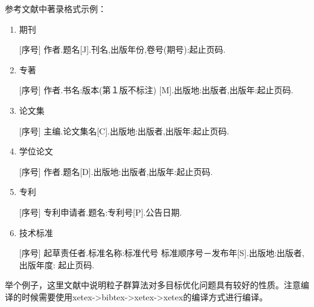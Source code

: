 \documentclass{suesreport}
\begin{document}
    
    参考文献中著录格式示例：
    \begin{enumerate}[label=（\arabic*） ]
        \item 期刊
        
        [序号] 作者.题名[J].刊名,出版年份,卷号(期号):起止页码.
        \item 专著
        
        [序号] 作者.书名:版本(第１版不标注) [M].出版地:出版者,出版年:起止页码.

        \item 论文集
        
        [序号] 主编.论文集名[C].出版地:出版者,出版年:起止页码.

        \item 学位论文
        
        [序号] 作者.题名[D].出版地:出版者,出版年:起止页码.

        \item 专利
        
        [序号] 专利申请者.题名:专利号[P].公告日期.

        \item 技术标准
        
        [序号] 起草责任者.标准名称:标准代号 标准顺序号－发布年[S].出版地:出版者,出版年度: 起止页码.
    \end{enumerate}
    举个例子，这里文献\cite{2004PSO_ZhangLibiao}中说明粒子群算法对多目标优化问题具有较好的性质。注意编译的时候需要使用xetex->bibtex->xetex->xetex的编译方式进行编译。
    
    \nocite{*}
    
\end{document}
